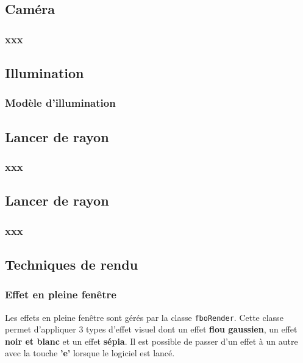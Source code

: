 \subsection{Caméra}
\subsubsection{xxx}

\subsection{Illumination}
\subsubsection{Modèle d'illumination}

\subsection{Lancer de rayon}
\subsubsection{xxx}

\subsection{Lancer de rayon}
\subsubsection{xxx}

\subsection{Techniques de rendu}
\subsubsection{Effet en pleine fenêtre}
Les effets en pleine fenêtre sont gérés par la classe \texttt{fboRender}. Cette classe permet d'appliquer 3 types d'effet visuel dont un effet \textbf{flou gaussien}, un effet \textbf{noir et blanc} et un effet \textbf{sépia}. Il est possible de passer d'un effet à un autre avec la touche \textbf{'e'} lorsque le logiciel est lancé.

